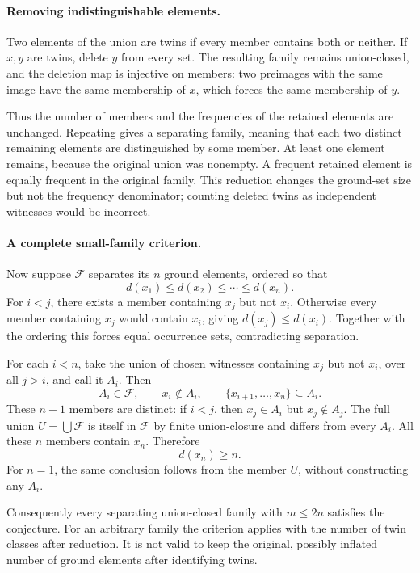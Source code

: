 \documentclass[11pt]{article}
\begin{document}
\paragraph{Removing indistinguishable elements.}
Two elements of the union are twins if every member contains both or neither. If $x,y$ are twins, delete $y$ from every set. The resulting family remains union-closed, and the deletion map is injective on members: two preimages with the same image have the same membership of $x$, which forces the same membership of $y$.

Thus the number of members and the frequencies of the retained elements are unchanged. Repeating gives a separating family, meaning that each two distinct remaining elements are distinguished by some member. At least one element remains, because the original union was nonempty. A frequent retained element is equally frequent in the original family. This reduction changes the ground-set size but not the frequency denominator; counting deleted twins as independent witnesses would be incorrect.

\paragraph{A complete small-family criterion.}
Now suppose $\mathcal F$ separates its $n$ ground elements, ordered so that
\[
 d(x_1)\le d(x_2)\le\cdots\le d(x_n).
\]
For $i<j$, there exists a member containing $x_j$ but not $x_i$. Otherwise every member containing $x_j$ would contain $x_i$, giving $d(x_j)\le d(x_i)$. Together with the ordering this forces equal occurrence sets, contradicting separation.

For each $i<n$, take the union of chosen witnesses containing $x_j$ but not $x_i$, over all $j>i$, and call it $A_i$. Then
\[
 A_i\in\mathcal F,\qquad x_i\notin A_i,\qquad
 \{x_{i+1},\ldots,x_n\}\subseteq A_i.
\]
These $n-1$ members are distinct: if $i<j$, then $x_j\in A_i$ but $x_j\notin A_j$. The full union $U=\bigcup\mathcal F$ is itself in $\mathcal F$ by finite union-closure and differs from every $A_i$. All these $n$ members contain $x_n$. Therefore
\[
 d(x_n)\ge n.
 \tag{411.1}
\]
For $n=1$, the same conclusion follows from the member $U$, without constructing any $A_i$.

Consequently every separating union-closed family with $m\le2n$ satisfies the conjecture. For an arbitrary family the criterion applies with the number of twin classes after reduction. It is not valid to keep the original, possibly inflated number of ground elements after identifying twins.
\end{document}
